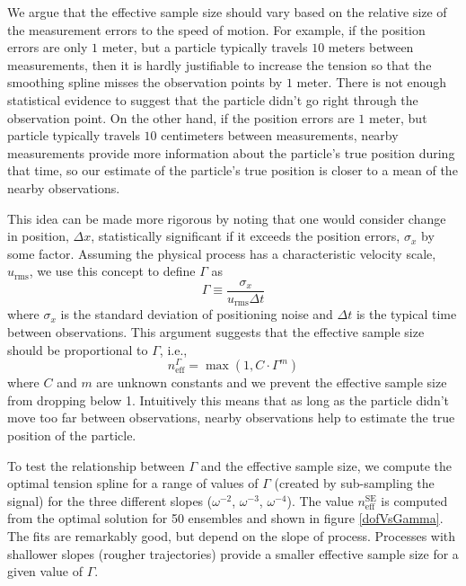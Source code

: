 \documentclass[10pt,journal]{IEEEtran}
\begin{document}
We argue that the effective sample size should vary based on the relative size of the measurement errors to the speed of motion. For example, if the position errors are only $1$ meter, but a particle typically travels $10$ meters between measurements, then it is hardly justifiable to increase the tension so that the smoothing spline misses the observation points by $1$ meter. There is not enough statistical evidence to suggest that the particle didn't go right through the observation point. On the other hand, if the position errors are $1$ meter, but particle typically travels $10$ centimeters between measurements, nearby measurements provide more information about the particle's true position during that time, so our estimate of the particle's true position is closer to a mean of the nearby observations.

This idea can be made more rigorous by noting that one would consider change in position, $\Delta x$, statistically significant if it exceeds the position errors, $\sigma_x$ by some factor.  Assuming the physical process has a characteristic velocity scale, $u_{\textrm{rms}}$, we use this concept to define $\Gamma$ as
\begin{equation}
\label{gamma_def}
\Gamma \equiv \frac{\sigma_x}{u_{\textrm{rms}}\Delta t}
\end{equation}
where $\sigma_x$ is the standard deviation of positioning noise and $\Delta t$ is the typical time between observations. This argument suggests that the effective sample size should be proportional to $\Gamma$, i.e.,
\begin{equation}
\label{gamma_equation}
n_{\textrm{eff}}^\Gamma = \max\left(1,C \cdot \Gamma^m\right)
\end{equation}
where $C$ and $m$ are unknown constants and we prevent the effective sample size from dropping below 1. Intuitively this means that as long as the particle didn't move too far between observations, nearby observations help to estimate the true position of the particle.

To test the relationship between $\Gamma$ and the effective sample size, we compute the optimal tension spline for a range of values of $\Gamma$ (created by sub-sampling the signal) for the three different slopes ($\omega^{-2}$, $\omega^{-3}$, $\omega^{-4}$). The value $n_{\textrm{eff}}^\textrm{SE}$ is computed from the optimal solution for 50 ensembles and shown in figure \ref{dofVsGamma}. The fits are remarkably good, but depend on the slope of process. Processes with shallower slopes (rougher trajectories) provide a smaller effective sample size for a given value of $\Gamma$. 
\end{document}
